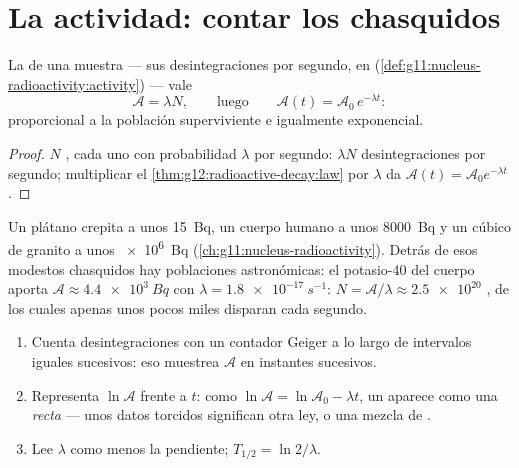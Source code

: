 \section{La actividad: contar los chasquidos}

\begin{proposition}[Actividad]\label{prop:g12:radioactive-decay:activity}
La  de una muestra --- sus desintegraciones por segundo, en 
(\cref{def:g11:nucleus-radioactivity:activity}) --- vale
\[
\mathcal A = \lambda N, \qquad\text{luego}\qquad \mathcal A(t) = \mathcal A_0 \, e^{-\lambda t}:
\]
proporcional a la población superviviente e igualmente exponencial.
\end{proposition}

\begin{proof}
$N$ , cada uno con probabilidad $\lambda$ por segundo: $\lambda N$
desintegraciones por segundo; multiplicar el
\cref{thm:g12:radioactive-decay:law} por $\lambda$ da
$\mathcal A(t) = \mathcal A_0 e^{-\lambda t}$.
\end{proof}

\begin{example}\label{ex:g12:radioactive-decay:body}
Un plátano crepita a unos \qty{15}{Bq}, un cuerpo humano a unos \qty{8000}{Bq} y un
 cúbico de granito a unos \qty{e6}{Bq} (\cref{ch:g11:nucleus-radioactivity}).
Detrás de esos modestos chasquidos hay poblaciones astronómicas: el potasio-40 del
cuerpo aporta $\mathcal A \approx \qty{4.4e3}{Bq}$ con
$\lambda = \qty{1.8e-17}{s^{-1}}$: $N = \mathcal A/\lambda \approx \num{2.5e20}$
, de los cuales apenas unos pocos miles disparan cada segundo.
\end{example}

\begin{method}\label{met:g12:radioactive-decay:semilog}
\begin{enumerate}
  \item Cuenta desintegraciones con un contador Geiger a lo largo de intervalos
        iguales sucesivos: eso muestrea $\mathcal A$ en instantes sucesivos.
  \item Representa $\ln \mathcal A$ frente a $t$: como
        $\ln \mathcal A = \ln \mathcal A_0 - \lambda t$, un 
        aparece como una \emph{recta} --- unos datos torcidos significan otra ley, o
        una mezcla de .
  \item Lee $\lambda$ como menos la pendiente; $T_{1/2} = \ln 2/\lambda$.
\end{enumerate}
\end{method}

